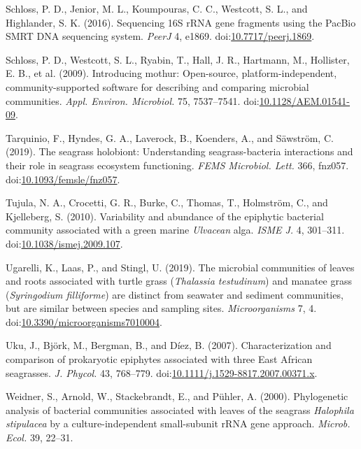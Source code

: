 \documentclass[
  12pt,
]{article}
\begin{document}
\leavevmode\hypertarget{ref-Schloss2016}{}%
Schloss, P. D., Jenior, M. L., Koumpouras, C. C., Westcott, S. L., and
Highlander, S. K. (2016). Sequencing 16S rRNA gene fragments using the
PacBio SMRT DNA sequencing system. \emph{PeerJ} 4, e1869.
doi:\href{https://doi.org/10.7717/peerj.1869}{10.7717/peerj.1869}.

\leavevmode\hypertarget{ref-Schloss2009}{}%
Schloss, P. D., Westcott, S. L., Ryabin, T., Hall, J. R., Hartmann, M.,
Hollister, E. B., et al. (2009). Introducing mothur: Open-source,
platform-independent, community-supported software for describing and
comparing microbial communities. \emph{Appl. Environ. Microbiol.} 75,
7537--7541.
doi:\href{https://doi.org/10.1128/AEM.01541-09}{10.1128/AEM.01541-09}.

\leavevmode\hypertarget{ref-Tarquinio2019}{}%
Tarquinio, F., Hyndes, G. A., Laverock, B., Koenders, A., and Säwström,
C. (2019). The seagrass holobiont: Understanding seagrass-bacteria
interactions and their role in seagrass ecosystem functioning.
\emph{FEMS Microbiol. Lett.} 366, fnz057.
doi:\href{https://doi.org/10.1093/femsle/fnz057}{10.1093/femsle/fnz057}.

\leavevmode\hypertarget{ref-Tujula2010}{}%
Tujula, N. A., Crocetti, G. R., Burke, C., Thomas, T., Holmström, C.,
and Kjelleberg, S. (2010). Variability and abundance of the epiphytic
bacterial community associated with a green marine \emph{Ulvacean} alga.
\emph{ISME J.} 4, 301--311.
doi:\href{https://doi.org/10.1038/ismej.2009.107}{10.1038/ismej.2009.107}.

\leavevmode\hypertarget{ref-Ugarelli2019}{}%
Ugarelli, K., Laas, P., and Stingl, U. (2019). The microbial communities
of leaves and roots associated with turtle grass (\emph{Thalassia
testudinum}) and manatee grass (\emph{Syringodium filliforme}) are
distinct from seawater and sediment communities, but are similar between
species and sampling sites. \emph{Microorganisms} 7, 4.
doi:\href{https://doi.org/10.3390/microorganisms7010004}{10.3390/microorganisms7010004}.

\leavevmode\hypertarget{ref-Uku2007}{}%
Uku, J., Björk, M., Bergman, B., and Díez, B. (2007). Characterization
and comparison of prokaryotic epiphytes associated with three East
African seagrasses. \emph{J. Phycol.} 43, 768--779.
doi:\href{https://doi.org/10.1111/j.1529-8817.2007.00371.x}{10.1111/j.1529-8817.2007.00371.x}.

\leavevmode\hypertarget{ref-Weidner2000}{}%
Weidner, S., Arnold, W., Stackebrandt, E., and Pühler, A. (2000).
Phylogenetic analysis of bacterial communities associated with leaves of
the seagrass \emph{Halophila stipulacea} by a culture-independent
small-subunit rRNA gene approach. \emph{Microb. Ecol.} 39, 22--31.
\end{document}
